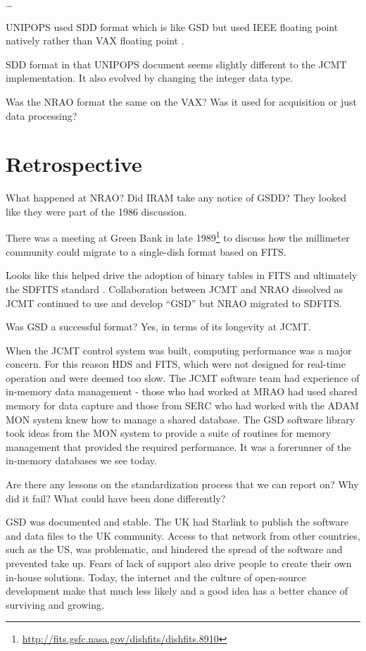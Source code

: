 \documentclass[final,authoryear,5p,times,twocolumn]{elsarticle}
\begin{document}
\ldots

{\color{red}

  UNIPOPS used SDD format which is like GSD but used IEEE floating
  point natively rather than VAX floating point \citep{UNIPOPS}.

  SDD format in that UNIPOPS document seems slightly different to the
  JCMT implementation. It also evolved by changing the integer data
  type.

  Was the NRAO format the same on the VAX? Was it used for acquisition
  or just data processing?
}

\section{Retrospective}

{\color{red}

What happened at NRAO? Did IRAM take any notice of GSDD? They looked
like they were part of the 1986 discussion.

There was a meeting at Green Bank in late
1989\footnote{\url{http://fits.gsfc.nasa.gov/dishfits/dishfits.8910}}
to discuss how the millimeter community could migrate to a
single-dish format based on FITS.

Looks like this helped drive the adoption of binary tables in FITS
\citep{1995A&AS..113..159C} and ultimately the SDFITS standard
\citep{2000ASPC..216..243G}. Collaboration between JCMT and NRAO
dissolved as JCMT continued to use and develop ``GSD'' but NRAO
migrated to SDFITS.

Was GSD a successful format? Yes, in terms of its longevity at JCMT.

When the JCMT control system was built, computing performance was a
major concern. For this reason HDS and FITS, which were not designed
for real-time operation and were deemed too slow. The JCMT software
team had experience of in-memory data management - those who had
worked at MRAO had used shared memory for data capture and those from
SERC who had worked with the ADAM MON system knew how to manage a
shared database. The GSD software library took ideas from the MON
system to provide a suite of routines for memory management that
provided the required performance. It was a forerunner of the
in-memory databases we see today.

Are there any lessons on the standardization process that we can
report on? Why did it fail? What could have been done differently?

GSD was documented and stable. The UK had Starlink to publish the
software and data files to the UK community. Access to that network
from other countries, such as the US, was problematic, and hindered
the spread of the software and prevented take up. Fears of lack of
support also drive people to create their own in-house
solutions. Today, the internet and the culture of open-source
development make that much less likely and a good idea has a better
chance of surviving and growing.

}
\end{document}
